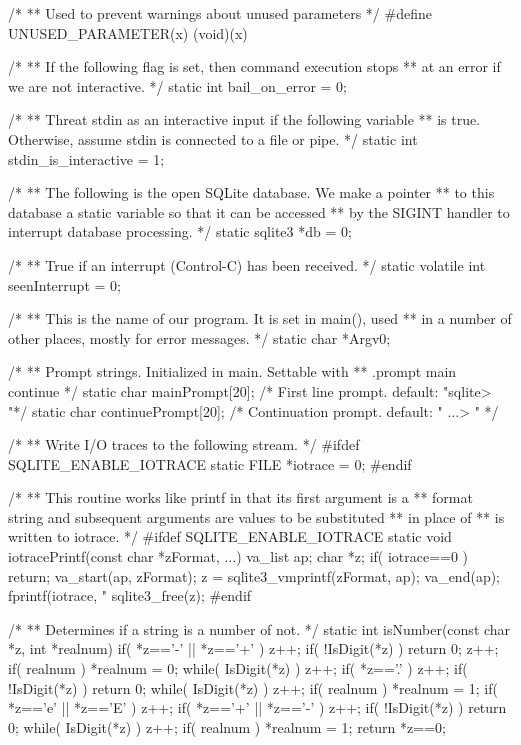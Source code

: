 \begin{Codex}[label=shell.c,numbers=left]
/*
** Used to prevent warnings about unused parameters
*/
#define UNUSED_PARAMETER(x) (void)(x)

/*
** If the following flag is set, then command execution stops
** at an error if we are not interactive.
*/
static int bail_on_error = 0;

/*
** Threat stdin as an interactive input if the following variable
** is true.  Otherwise, assume stdin is connected to a file or pipe.
*/
static int stdin_is_interactive = 1;

/*
** The following is the open SQLite database.  We make a pointer
** to this database a static variable so that it can be accessed
** by the SIGINT handler to interrupt database processing.
*/
static sqlite3 *db = 0;

/*
** True if an interrupt (Control-C) has been received.
*/
static volatile int seenInterrupt = 0;

/*
** This is the name of our program. It is set in main(), used
** in a number of other places, mostly for error messages.
*/
static char *Argv0;

/*
** Prompt strings. Initialized in main. Settable with
**   .prompt main continue
*/
static char mainPrompt[20];     /* First line prompt. default: "sqlite> "*/
static char continuePrompt[20]; /* Continuation prompt. default: "   ...> " */

/*
** Write I/O traces to the following stream.
*/
#ifdef SQLITE_ENABLE_IOTRACE
static FILE *iotrace = 0;
#endif

/*
** This routine works like printf in that its first argument is a
** format string and subsequent arguments are values to be substituted
** in place of %
** is written to iotrace.
*/
#ifdef SQLITE_ENABLE_IOTRACE
static void iotracePrintf(const char *zFormat, ...){
  va_list ap;
  char *z;
  if( iotrace==0 ) return;
  va_start(ap, zFormat);
  z = sqlite3_vmprintf(zFormat, ap);
  va_end(ap);
  fprintf(iotrace, "%
  sqlite3_free(z);
}
#endif


/*
** Determines if a string is a number of not.
*/
static int isNumber(const char *z, int *realnum){
  if( *z=='-' || *z=='+' ) z++;
  if( !IsDigit(*z) ){
    return 0;
  }
  z++;
  if( realnum ) *realnum = 0;
  while( IsDigit(*z) ){ z++; }
  if( *z=='.' ){
    z++;
    if( !IsDigit(*z) ) return 0;
    while( IsDigit(*z) ){ z++; }
    if( realnum ) *realnum = 1;
  }
  if( *z=='e' || *z=='E' ){
    z++;
    if( *z=='+' || *z=='-' ) z++;
    if( !IsDigit(*z) ) return 0;
    while( IsDigit(*z) ){ z++; }
    if( realnum ) *realnum = 1;
  }
  return *z==0;
}


\end{Codex}

